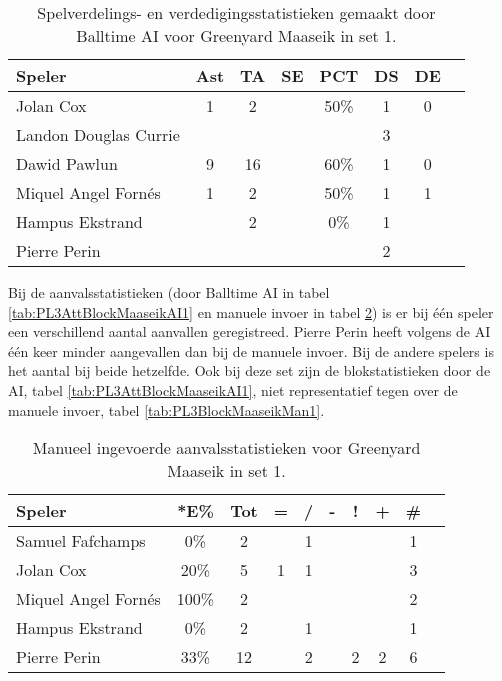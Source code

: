 \begin{table}[ht!]
  \centering
  \scriptsize
  \begin{tabular}{|l|c|c|c|c|c|c|c|} \hline
    \textbf{Speler} & Ast & TA & SE & PCT & DS & DE \\ \hline
    Jolan Cox & 1 & 2 &  & 50\% & 1 & 0 \\
    Landon Douglas Currie &  &  &   &   & 3 &   \\
    Dawid Pawlun & 9 & 16 &  & 60\% & 1 & 0 \\
    Miquel Angel Fornés & 1 & 2 & & 50\% & 1 & 1 \\
    Hampus Ekstrand &  & 2 &  & 0\% & 1 & \\
    Pierre Perin &   &   &   &   & 2 &   \\ \hline
  \end{tabular}
  \caption[Spelverdelings- en verdedigingsstatistieken gemaakt door Balltime AI voor Greenyard Maaseik in set 1]{\label{tab:PL3SetDigMaaseikAI1}Spelverdelings- en verdedigingsstatistieken gemaakt door Balltime AI voor Greenyard Maaseik in set 1.}
\end{table}

Bij de aanvalsstatistieken (door Balltime AI in tabel \ref{tab:PL3AttBlockMaaseikAI1} en manuele invoer in tabel \ref{tab:PL3AttMaaseikMan1}) is er bij één speler een verschillend aantal aanvallen geregistreed. Pierre Perin heeft volgens de AI één keer minder aangevallen dan bij de manuele invoer. Bij de andere spelers is het aantal bij beide hetzelfde. Ook bij deze set zijn de blokstatistieken door de AI, tabel \ref{tab:PL3AttBlockMaaseikAI1}, niet representatief tegen over de manuele invoer, tabel \ref{tab:PL3BlockMaaseikMan1}.

\begin{table}[ht!]
    \centering
    \scriptsize
    \begin{tabular}{|l|c|c|c|c|c|c|c|c|c|} \hline
        \textbf{Speler} & *E\% & Tot & = & / & - & ! & + & \# \\ \hline
        Samuel Fafchamps & 0\% & 2 &  & 1 &  &  &  & 1 \\ 
        Jolan Cox & 20\% & 5 & 1 & 1 &  &  &  & 3 \\ 
        Miquel Angel Fornés & 100\% & 2 &  &  &  &  &  & 2 \\ 
        Hampus Ekstrand & 0\% & 2 &  & 1 &  &  &  & 1 \\ 
        Pierre Perin & 33\% & 12 &  & 2 &  & 2 & 2 & 6 \\ \hline
    \end{tabular}
    \caption[Manueel ingevoerde aanvalsstatistieken voor Greenyard Maaseik in set 1]{\label{tab:PL3AttMaaseikMan1}Manueel ingevoerde aanvalsstatistieken voor Greenyard Maaseik in set 1.}
\end{table}

